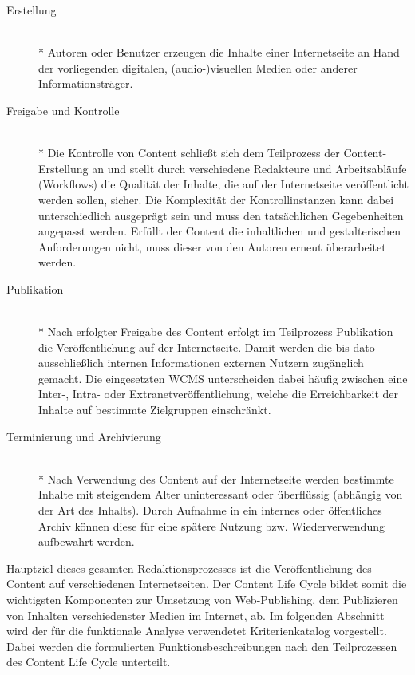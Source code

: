 \begin{description}
\item[Erstellung]\mbox{~}\\*
Autoren oder Benutzer erzeugen die Inhalte einer Internetseite an Hand der vorliegenden digitalen, (audio-)visuellen Medien oder anderer Informationsträger.
\item[Freigabe und Kontrolle]\mbox{~}\\*
Die Kontrolle von Content schließt sich dem Teilprozess der Content-Erstellung an und stellt durch verschiedene Redakteure und Arbeitsabläufe (Workflows) die Qualität der Inhalte, die auf der Internetseite veröffentlicht werden sollen, sicher. Die Komplexität der Kontrollinstanzen kann dabei unterschiedlich ausgeprägt sein und muss den tatsächlichen Gegebenheiten angepasst werden. Erfüllt der Content die inhaltlichen und gestalterischen Anforderungen nicht, muss dieser von den Autoren erneut überarbeitet werden.
\item[Publikation]\mbox{~}\\*
Nach erfolgter Freigabe des Content erfolgt im Teilprozess Publikation die Veröffentlichung auf der Internetseite. Damit werden die bis dato ausschließlich internen Informationen externen Nutzern zugänglich gemacht. Die eingesetzten WCMS unterscheiden dabei häufig zwischen eine Inter-, Intra- oder Extranetveröffentlichung, welche die Erreichbarkeit der Inhalte auf bestimmte  Zielgruppen einschränkt.
\item[Terminierung und Archivierung]\mbox{~}\\*
Nach Verwendung des Content auf der Internetseite werden bestimmte Inhalte mit steigendem Alter uninteressant oder überflüssig (abhängig von der Art des Inhalts). Durch Aufnahme in ein internes oder öffentliches Archiv können diese für eine spätere Nutzung bzw. Wiederverwendung aufbewahrt werden.
\end{description}

Hauptziel dieses gesamten Redaktionsprozesses ist die Veröffentlichung des Content auf verschiedenen Internetseiten. Der Content Life Cycle bildet somit die wichtigsten Komponenten zur Umsetzung von Web-Publishing, dem Publizieren von Inhalten verschiedenster Medien im Internet, ab. Im folgenden Abschnitt wird der für die funktionale Analyse verwendetet Kriterienkatalog vorgestellt. Dabei werden die formulierten Funktionsbeschreibungen nach den Teilprozessen des Content Life Cycle unterteilt.

